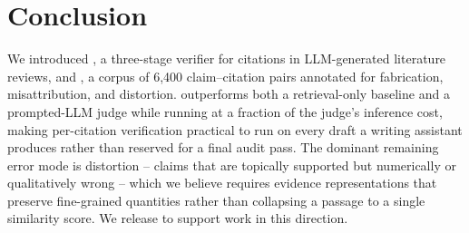 \section{Conclusion}

We introduced , a three-stage verifier for citations in
LLM-generated literature reviews, and , a corpus of
6,400 claim--citation pairs annotated for fabrication, misattribution, and
distortion.  outperforms both a retrieval-only baseline
and a prompted-LLM judge while running at a fraction of the judge's
inference cost, making per-citation verification practical to run on every
draft a writing assistant produces rather than reserved for a final audit
pass. The dominant remaining error mode is distortion -- claims that are
topically supported but numerically or qualitatively wrong -- which we
believe requires evidence representations that preserve fine-grained
quantities rather than collapsing a passage to a single similarity score.
We release  to support work in this direction.



